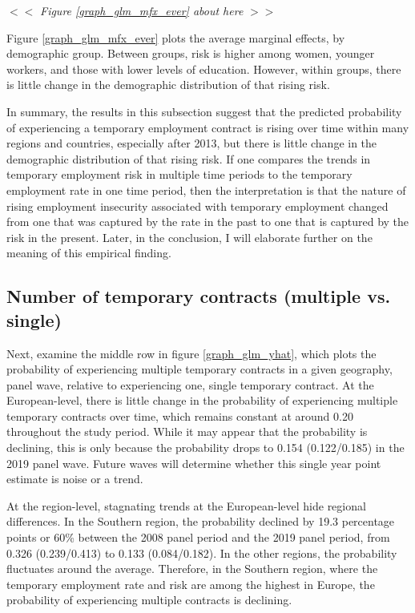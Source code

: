 \documentclass[12pt]{article}
\begin{document}
\begin{center}
$<<$ \emph{Figure \ref{graph_glm_mfx_ever} about here} $>>$
\end{center}

Figure \ref{graph_glm_mfx_ever} plots the average marginal effects, by demographic group.  Between groups, risk is higher among women, younger workers, and those with lower levels of education.  However, within groups, there is little change in the demographic distribution of that rising risk.  

In summary, the results in this subsection suggest that the predicted probability of experiencing a temporary employment contract is rising over time within many regions and countries, especially after 2013, but there is little change in the demographic distribution of that rising risk.  If one compares the trends in temporary employment risk in multiple time periods to the temporary employment rate in one time period, then the interpretation is that the nature of rising employment insecurity associated with temporary employment changed from one that was captured by the rate in the past to one that is captured by the risk in the present.  Later, in the conclusion, I will elaborate further on the meaning of this empirical finding.

\subsection{Number of temporary contracts (multiple vs. single)}

Next, examine the middle row in figure \ref{graph_glm_yhat}, which plots the probability of experiencing multiple temporary contracts in a given geography, panel wave, relative to experiencing one, single temporary contract.  At the European-level, there is little change in the probability of experiencing multiple temporary contracts over time, which remains constant at around 0.20 throughout the study period.  While it may appear that the probability is declining, this is only because the probability drops to 0.154 (0.122/0.185) in the 2019 panel wave.  Future waves will determine whether this single year point estimate is noise or a trend.  

At the region-level, stagnating trends at the European-level hide regional differences.  In the Southern region, the probability declined by 19.3 percentage points or 60\% between the 2008 panel period and the 2019 panel period, from 0.326 (0.239/0.413) to 0.133 (0.084/0.182).  In the other regions, the probability fluctuates around the average.  Therefore, in the Southern region, where the temporary employment rate and risk are among the highest in Europe, the probability of experiencing multiple contracts is declining.  
\end{document}
